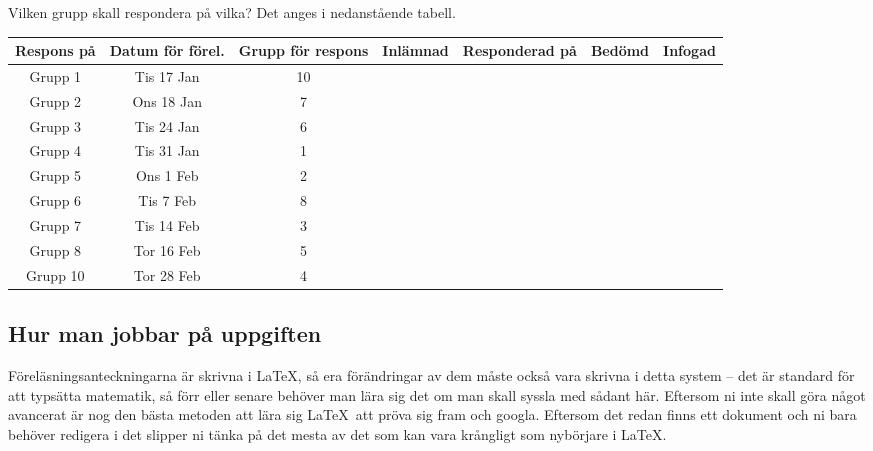 \documentclass{tufte-handout}
\begin{document}
Vilken grupp skall respondera på vilka? Det anges i nedanstående tabell.

\begin{fullwidth}
	\begin{table}[h]
		\begin{tabularx}{0.78\pdfpagewidth}{ccccccc}
		Respons på & Datum för förel.  & Grupp för respons & Inlämnad & Responderad på & Bedömd & Infogad\\
		\midrule
		Grupp 1            & Tis 17 Jan & 10 & \checkmark & & &\\
		Grupp 2            & Ons 18 Jan & 7 & \checkmark & & &\\
		Grupp 3            & Tis 24 Jan & 6 & & & &\\
		Grupp 4            & Tis 31 Jan & 1 & & & &\\
		Grupp 5	      	   & Ons 1 Feb & 2 & & & &\\
		Grupp 6            & Tis 7 Feb & 8 & & & &\\
		Grupp 7            & Tis 14 Feb  & 3 & & & &\\
		Grupp 8            & Tor 16 Feb  & 5 & & & &\\
		Grupp 10           & Tor 28 Feb & 4 & & & &%
		\end{tabularx}
	\end{table}
\end{fullwidth}

\subsection{Hur man jobbar på uppgiften}

Föreläsningsanteckningarna är skrivna i \LaTeX, så era förändringar av dem måste också vara skrivna i detta system -- det är standard för att typsätta matematik, så förr eller senare behöver man lära sig det om man skall syssla med sådant här. Eftersom ni inte skall göra något avancerat är nog den bästa metoden att lära sig \LaTeX\ att pröva sig fram och googla. Eftersom det redan finns ett dokument och ni bara behöver redigera i det slipper ni tänka på det mesta av det som kan vara krångligt som nybörjare i \LaTeX.
\end{document}
